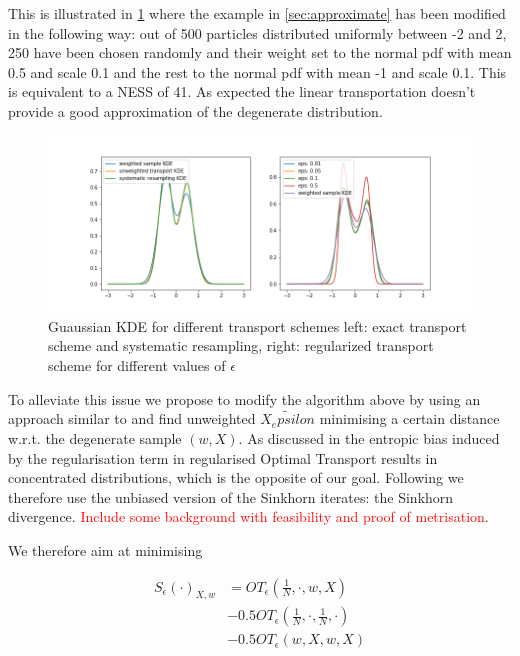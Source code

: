 \documentclass[%
reprint,
amsmath,amssymb,
aps,
]{revtex4-2}
\newcommand\todo[1]{\textcolor{red}{#1}}
\begin{document}
		This is illustrated in \cref{fig:degenerate_map} where the example in \cref{sec:approximate} has been modified in the following way: out of 500 particles distributed uniformly between -2 and 2, 250 have been chosen randomly and their weight set to the normal pdf with mean 0.5 and scale 0.1 and the rest to the normal pdf with mean -1 and scale 0.1. This is equivalent to a NESS of 41. As expected the linear transportation doesn't provide a good approximation of the degenerate distribution.
		
		\begin{figure}
			\includegraphics[width=\linewidth]{DegenerateTransport}
			\caption{
				Guaussian KDE for different transport schemes
				left: exact transport scheme and systematic resampling, right: regularized transport scheme for different values of $\epsilon$}
			\label{fig:degenerate_map}
		\end{figure}	
		
		To alleviate this issue we propose to modify the algorithm above by using an approach similar to \cite{genevay2017learning} and find unweighted $\tilde{X_epsilon}$ minimising a certain distance w.r.t. the degenerate sample $(w, X)$. As discussed in \cite{feydy:interpolating} the entropic bias induced by the regularisation term in regularised Optimal Transport results in concentrated distributions, which is the opposite of our goal. Following \cite{genevay2017learning} we therefore use the unbiased version of the Sinkhorn iterates: the Sinkhorn divergence. \todo{Include some background with feasibility \cite{feydy:interpolating} and proof of metrisation}.
		
		We therefore aim at minimising 
		
		\begin{align*} 
		S_\epsilon(\cdot)_{X, w} 
			&= OT_{\epsilon}\left(\frac 1 N, \cdot, w, X\right) \\
			&- 0.5 OT_\epsilon\left(\frac 1 N, \cdot, \frac 1 N, \cdot \right) \\ 
			&- 0.5 OT_\epsilon(w, X, w, X)
		\end{align*}
		
\end{document}
